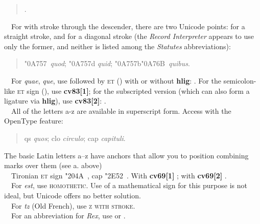 \begin{quote}
.
\end{quote}
\noindent{}\ \ For  with stroke through the descender, there are two Unicode points:  for a
straight stroke, and  for a diagonal stroke (the \textit{Record Interpreter} appears to use only the
former, and neither is listed among the \textit{Statutes} abbreviations):
\begin{quote}
\char"0A757\ \textit{quod}; \char"0A757d \textit{quid}; \char"0A757b\char"0A76B\ \textit{quibus}.
\end{quote}
\noindent{}\ \ For \textit{quae}, \textit{que}, use 
followed by \textsc{et} () with or without \textbf{hlig}: 
. For the semicolon-like \textsc{et} sign (\textbf{}), use
\textbf{cv83[1]}; for the subscripted version (which can also form a ligature via \textbf{hlig}), use \textbf{cv83[2]}:
.\\[1ex]

\noindent{}\ \ All of the letters a-z are available in superscript form. Access with the 
OpenType feature:
\begin{quote}
qs \textit{quos}; clo \textit{circulo}; cap \textit{capituli}.
\end{quote}
The basic Latin letters a--z have anchors that allow you to position combining marks over them (see a. above)\\[1ex]

\noindent{}\ \ Tironian \textsc{et} sign \char"204A\ , cap \char"2E52\ . With \textbf{cv69[1]} ; with
\textbf{cv69[2]} .\\[1ex]

\noindent{}\ \ For \textit{est}, use   \textsc{homothetic}. Use of a mathematical sign for this
purpose is not ideal, but Unicode offers no better solution.\\[1ex]

\noindent{}\ \ For \textit{tz} (Old French), use   \textsc{z with stroke}.\\[1ex]

\noindent{}\ \ For an abbreviation for \textit{Rex},
use \textex{\textrecipe}  or  .\\[1ex]

